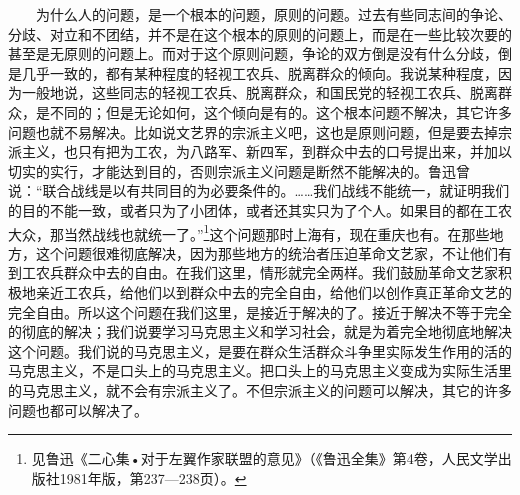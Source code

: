 \documentclass[cn,11pt,chinese]{elegantbook}
\begin{document}
　　为什么人的问题，是一个根本的问题，原则的问题。过去有些同志间的争论、分歧、对立和不团结，并不是在这个根本的原则的问题上，而是在一些比较次要的甚至是无原则的问题上。而对于这个原则问题，争论的双方倒是没有什么分歧，倒是几乎一致的，都有某种程度的轻视工农兵、脱离群众的倾向。我说某种程度，因为一般地说，这些同志的轻视工农兵、脱离群众，和国民党的轻视工农兵、脱离群众，是不同的；但是无论如何，这个倾向是有的。这个根本问题不解决，其它许多问题也就不易解决。比如说文艺界的宗派主义吧，这也是原则问题，但是要去掉宗派主义，也只有把为工农，为八路军、新四军，到群众中去的口号提出来，并加以切实的实行，才能达到目的，否则宗派主义问题是断然不能解决的。鲁迅曾说：“联合战线是以有共同目的为必要条件的。……我们战线不能统一，就证明我们的目的不能一致，或者只为了小团体，或者还其实只为了个人。如果目的都在工农大众，那当然战线也就统一了。”\footnote[5]{ 见鲁迅《二心集•对于左翼作家联盟的意见》（《鲁迅全集》第4卷，人民文学出版社1981年版，第237—238页）。}这个问题那时上海有，现在重庆也有。在那些地方，这个问题很难彻底解决，因为那些地方的统治者压迫革命文艺家，不让他们有到工农兵群众中去的自由。在我们这里，情形就完全两样。我们鼓励革命文艺家积极地亲近工农兵，给他们以到群众中去的完全自由，给他们以创作真正革命文艺的完全自由。所以这个问题在我们这里，是接近于解决的了。接近于解决不等于完全的彻底的解决；我们说要学习马克思主义和学习社会，就是为着完全地彻底地解决这个问题。我们说的马克思主义，是要在群众生活群众斗争里实际发生作用的活的马克思主义，不是口头上的马克思主义。把口头上的马克思主义变成为实际生活里的马克思主义，就不会有宗派主义了。不但宗派主义的问题可以解决，其它的许多问题也都可以解决了。\\
\end{document}
